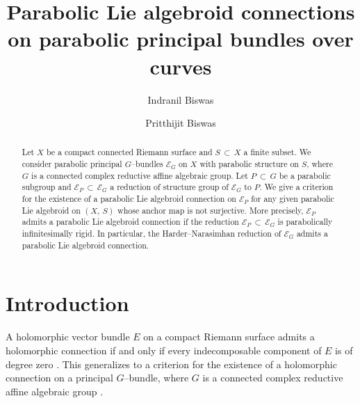 \documentclass[12pt, reqno]{amsart}
\numberwithin{equation}{section}
\begin{document}
\title[Parabolic Lie algebroid connections]{Parabolic Lie algebroid connections on parabolic principal 
bundles over curves}

\author[I. Biswas]{Indranil Biswas} 

\address{Department of Mathematics, Shiv Nadar University, NH91, Tehsil Dadri, Greater Noida, Uttar Pradesh 
201314, India.}


\author[P. Biswas]{Pritthijit Biswas} 

\address{Kerala School of Mathematics, Kunnamangalam, Kozhikode, 673571 Kerala, India.}




\date{}

\begin{abstract}
Let $X$ be a compact connected Riemann surface and $S\,\subset\, X$ a finite subset. We consider parabolic 
principal $G$--bundles $\mathcal{E}_{G}$ on $X$ with parabolic structure on
$S$, where $G$ is a connected complex reductive affine algebraic group. Let $P\, \subset\, G$ be a parabolic
subgroup and $\mathcal{E}_{P}\, \subset\, \mathcal{E}_{G}$ a 
reduction of structure group of $\mathcal{E}_{G}$ to $P$. We give a criterion 
for the existence of a parabolic Lie algebroid connection on $\mathcal{E}_{P}$ for any given parabolic Lie 
algebroid on $(X,\,S)$ whose anchor map is not surjective. More precisely,
$\mathcal{E}_{P}$ admits a parabolic Lie algebroid connection if the reduction $\mathcal{E}_{P}\, \subset\,
\mathcal{E}_{G}$ is parabolically infinitesimally rigid. In particular, the 
Harder--Narasimhan reduction of $\mathcal{E}_{G}$ admits a parabolic Lie 
algebroid connection.
\end{abstract}

\maketitle
\tableofcontents
\section{Introduction}

A holomorphic vector bundle $E$ on a compact Riemann surface admits a holomorphic connection if and only if 
every indecomposable component of $E$ is of degree zero \cite{At}. This generalizes to a criterion for 
the existence of a holomorphic connection on a principal $G$--bundle, where
$G$ is a connected complex reductive affine algebraic group \cite{AB1}.
\end{document}
